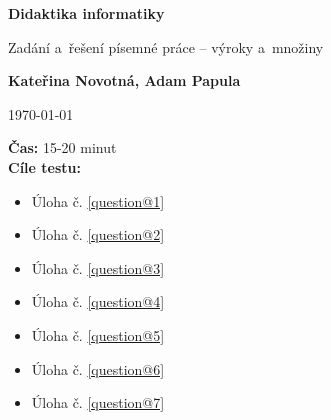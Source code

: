\documentclass[12pt,a4paper,addpoints]{exam}
\def\maintitle{Didaktika informatiky}
\def\subtitle{Zadání a~řešení písemné práce -- výroky a~množiny}
\def\authorname{Kateřina Novotná, Adam Papula}
\begin{document}
    \begin{titlepage}
        \begin{center}
            \Large\textbf{{\maintitle}}

            \normalsize
            \vspace{0.5cm}
                \subtitle
            \vspace{1.5cm}
            
            \textbf{\authorname}
            \vspace{1.5cm}

            \today
            \vfill
            
            \raggedright
                \textbf{Čas:} 15-20 minut\\
                \textbf{Cíle testu:}
                \noindent
                \footnotesize
                \begin{itemize}[topsep=0pt]
                \item Úloha č. \ref{question@1}\\
                \item Úloha č. \ref{question@2}\\
                \item Úloha č. \ref{question@3}\\
                \item Úloha č. \ref{question@4}\\
                \item Úloha č. \ref{question@5}\\
                \item Úloha č. \ref{question@6}\\
                \item Úloha č. \ref{question@7}\\

                \end{itemize}
        \end{center}
    \end{titlepage}

    
    

    \printanswers
    
    
\end{document}
